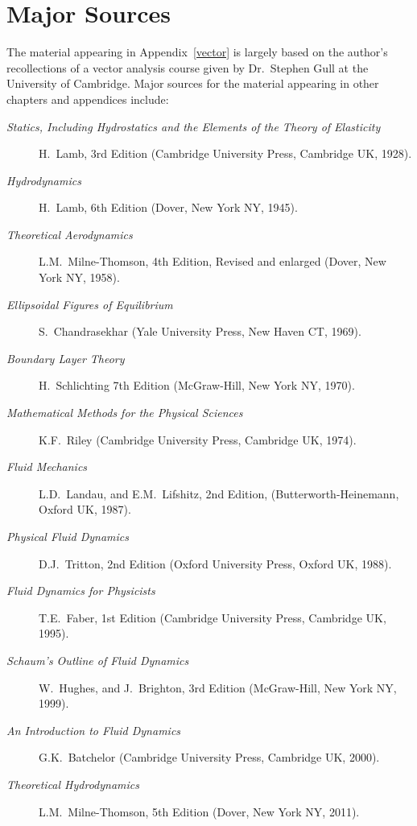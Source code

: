 \section{Major Sources}
The material appearing in Appendix~\ref{vector} is largely based on the author's recollections
of a vector analysis course given by Dr.~Stephen Gull at the University
of Cambridge. Major sources for the material appearing in other chapters and appendices 
include:
\begin{description}
\item [\em Statics, Including Hydrostatics and the Elements of the Theory of Elasticity] H.~Lamb, 3rd Edition (Cambridge University Press, Cambridge UK, 1928).
\item [\em Hydrodynamics] H.~Lamb, 6th Edition (Dover, New York NY, 1945).
\item[\em Theoretical Aerodynamics] L.M.~Milne-Thomson, 4th Edition, Revised and enlarged (Dover, New York NY, 1958).
\item [\em Ellipsoidal Figures of Equilibrium] S.~Chandrasekhar (Yale University Press, New Haven CT, 1969).
\item[\em Boundary Layer Theory] H.~Schlichting 7th Edition (McGraw-Hill, New York NY, 1970).
\item [\em Mathematical Methods for the Physical Sciences] K.F.~Riley (Cambridge University Press, Cambridge UK, 1974).
\item [\em Fluid Mechanics] L.D.~Landau, and E.M.~Lifshitz, 2nd Edition, (Butterworth-Heinemann, Oxford UK, 1987).
\item [\em Physical Fluid Dynamics] D.J.~Tritton, 2nd Edition (Oxford University Press, Oxford UK, 1988).
\item [\em Fluid Dynamics for Physicists] T.E.~Faber, 1st Edition (Cambridge University Press, Cambridge UK, 1995).
\item [\em Schaum's Outline of Fluid Dynamics] W.~Hughes, and J.~Brighton, 3rd Edition (McGraw-Hill, New York NY, 1999).
\item [\em An Introduction to Fluid Dynamics] G.K.~Batchelor (Cambridge University Press, Cambridge UK, 2000).
\item [\em Theoretical Hydrodynamics] L.M.~Milne-Thomson, 5th Edition (Dover, New York NY, 2011).
\end{description}

